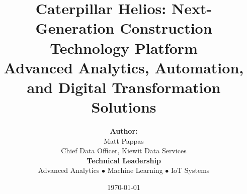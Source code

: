 \usepackage{titling}

\title{Caterpillar Helios: Next-Generation Construction Technology Platform\\[0.5ex]
Advanced Analytics, Automation, and Digital Transformation Solutions}

\author{%
\textbf{Author:}\\[1ex]
Matt Pappas\\
Chief Data Officer, Kiewit Data Services\\[2ex]
\textbf{Technical Leadership}\\
Advanced Analytics $\bullet$ Machine Learning $\bullet$ IoT Systems
}
\date{\today}


\usepackage{lettrine} %
\usepackage{fix-cm}	%

\newcommand{\initial}[1]{ %
	\lettrine[lines=3,findent=4pt,nindent=0pt]{%
		\color{Black}%
		{#1}%
	}{}%
}

\usepackage{xstring} %

\newcommand{\lettrineabstract}[1]{
	\StrLeft{#1}{1}[\firstletter] %
	\initial{\firstletter}\textmd{\StrGobbleLeft{#1}{1}} %
}

